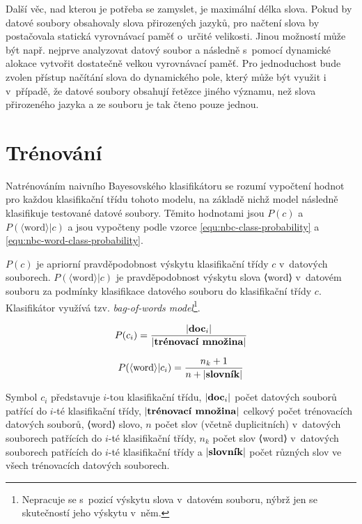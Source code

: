 \documentclass[a4paper, 12pt]{report}
\begin{document}
Další věc, nad kterou je potřeba se zamyslet, je maximální délka slova. 
Pokud by datové soubory obsahovaly slova přirozených jazyků, pro načtení 
slova by postačovala statická vyrovnávací paměť o~určité velikosti. Jinou 
možností může být např. nejprve analyzovat datový soubor a následně
s~pomocí dynamické alokace vytvořit dostatečně velkou vyrovnávací paměť. Pro 
jednoduchost bude zvolen přístup načítání slova do dynamického pole, který 
může být využit i v~případě, že datové soubory obsahují řetězce jiného 
významu, než slova přirozeného jazyka a ze souboru je tak čteno pouze 
jednou.

\section{Trénování}
\label{text:analysis-nbc-learn}

Natrénováním naivního Bayesovského klasifikátoru se rozumí vypočtení 
hodnot pro každou klasifikační třídu tohoto modelu, na základě nichž model 
následně klasifikuje testované datové soubory. Těmito hodnotami jsou 
$P(c)$ a $P(\langle \text{word} \rangle|c)$ a jsou vypočteny podle vzorce 
\ref{equ:nbc-class-probability} a \ref{equ:nbc-word-class-probability}.

$P(c)$ je apriorní pravděpodobnost výskytu klasifikační třídy $c$
v~datových souborech. $P(\langle \text{word} \rangle|c)$ je pravděpodobnost 
výskytu slova ⟨word⟩ v~datovém souboru za podmínky klasifikace datového 
souboru do klasifikační třídy $c$. Klasifikátor využívá tzv. 
\textit{bag-of-words model}\footnote{Nepracuje se s~pozicí výskytu slova
v~datovém souboru, nýbrž jen se skutečností jeho výskytu v~něm.}.

\begin{equation}
    P(c_i) = \frac{|\text{\textbf{doc}}_i|}{|\text{\textbf{trénovací 
množina}}|}
    \label{equ:nbc-class-probability}
\end{equation}

\begin{equation}
    P(\langle \text{word} \rangle|c_i) = \frac{n_k + 1}{n + 
|\text{\textbf{slovník}}|}
    \label{equ:nbc-word-class-probability}
\end{equation}

Symbol $c_i$ představuje $i$-tou klasifikační třídu, 
$|\text{\textbf{doc}}_i|$ počet datových souborů patřící do $i$-té 
klasifikační třídy, $|\text{\textbf{trénovací množina}}|$ celkový počet 
trénovacích datových souborů, ⟨word⟩ slovo, $n$ počet slov (včetně 
duplicitních) v~datových souborech patřících do $i$-té klasifikační třídy, 
$n_k$ počet slov ⟨word⟩ v~datových souborech patřících do $i$-té 
klasifikační třídy a $|\text{\textbf{slovník}}|$ počet různých slov ve 
všech trénovacích datových souborech.
\end{document}
